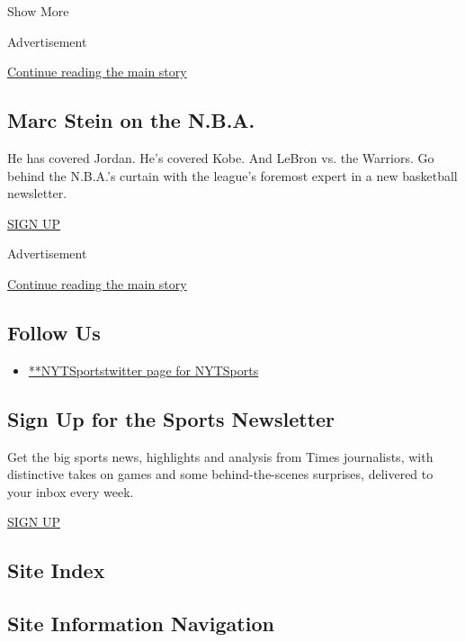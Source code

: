 Show More

Advertisement

\protect\hyperlink{after-mid2}{Continue reading the main story}

\hypertarget{marc-stein-on-the-nba}{%
\subsection{Marc Stein on the N.B.A.}\label{marc-stein-on-the-nba}}

He has covered Jordan. He's covered Kobe. And LeBron vs. the Warriors.
Go behind the N.B.A.'s curtain with the league's foremost expert in a
new basketball newsletter.

\href{/newsletters/signup/MSB}{SIGN UP}

Advertisement

\protect\hyperlink{after-mktg}{Continue reading the main story}

\hypertarget{follow-us}{%
\subsection{Follow Us}\label{follow-us}}

\begin{itemize}
\tightlist
\item
  \href{https://twitter.com/NYTSports}{**NYTSportstwitter page for
  NYTSports}
\end{itemize}

\hypertarget{sign-up-for-the-sports-newsletter}{%
\subsection{Sign Up for the Sports
Newsletter}\label{sign-up-for-the-sports-newsletter}}

Get the big sports news, highlights and analysis from Times journalists,
with distinctive takes on games and some behind-the-scenes surprises,
delivered to your inbox every week.

\href{/newsletters/signup/SP}{SIGN UP}

\hypertarget{site-index}{%
\subsection{Site Index}\label{site-index}}

\hypertarget{site-information-navigation}{%
\subsection{Site Information
Navigation}\label{site-information-navigation}}

